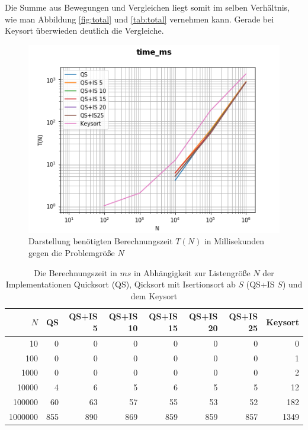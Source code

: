 \documentclass[
   draft=false
  ,paper=a4
  ,twoside=false
  ,fontsize=11pt
  ,headsepline
  ,DIV=11
  ,parskip=full+
  ,titlepage
]{scrartcl} %
\begin{document}
Die Summe aus Bewegungen und Vergleichen liegt somit im selben Verhältnis, wie man Abbildung \ref{fig:total} und \ref{tab:total} vernehmen kann. 
Gerade bei Keysort überwieden deutlich die Vergleiche.


\begin{figure}[htp]
  \centering
  \includegraphics[width=\textwidth]{../time_ms.png}
  \caption[Zeit]{Darstellung benötigten Berechnungszeit $T(N)$ in
   Millisekunden gegen die Problemgröße $N$}
  \label{fig:time}
\end{figure}

\begin{table}[htp]
  \centering
  \caption[Bewegungen]{Die Berechnungszeit in $ms$ in Abhängigkeit 
  zur Listengröße $N$ der Implementationen Quicksort (QS),
  Qicksort mit Isertionsort ab $S$ (QS+IS $S$) und dem Keysort}
  \label{tab:time}
  \begin{tabular}{|r|r|r|r|r|r|r|r|}
  \hline
  $N$ & QS & QS+IS 5 & QS+IS 10 & QS+IS 15 & QS+IS 20 & QS+IS 25 & Keysort \\
  \hline
10 & 0 & 0 & 0 & 0 & 0 & 0 & 0 \\
100 & 0 & 0 & 0 & 0 & 0 & 0 & 1 \\
1000 & 0 & 0 & 0 & 0 & 0 & 0 & 2 \\
10000 & 4 & 6 & 5 & 6 & 5 & 5 & 12 \\
100000 & 60 & 63 & 57 & 55 & 53 & 52 & 182 \\
1000000 & 855 & 890 & 869 & 859 & 859 & 857 & 1349 \\
\hline
  \end{tabular}
\end{table}
\end{document}
